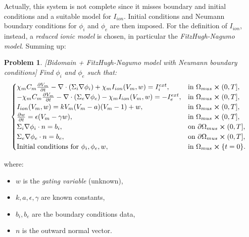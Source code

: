 \documentclass[a4paper,11pt]{article}
\newtheorem{problem}{Problem}
\begin{document}
    \vspace{4mm}
    \noindent Actually, this system is not complete since it misses boundary and initial conditions and a suitable model for $I_{ion}$. Initial conditions and Neumann boundary conditions for $\phi_i$ and $\phi_e$ are then imposed. For the definition of $I_{ion}$, instead, a \emph{reduced ionic model} is chosen, in particular the \emph{FitzHugh-Nagumo model}. Summing up:\newpage
        \begin{problem}\label{def1}[Bidomain + FitzHugh-Nagumo model with Neumann boundary conditions]
      	Find $\phi_i$ and $\phi_e$ such that:
    	\begin{equation*}
    	\begin{cases}
    	\chi_m C_m\pdv{V_m}{t} - \nabla \cdot (\Sigma_i \nabla \phi_i) + \chi_m I_{ion}(V_m,w) = I_i^{ext},    & \text{in } \Omega_{mus} \cross (0,T],
    	\\
    	-\chi_m C_m\pdv{V_m}{t} - \nabla \cdot (\Sigma_e \nabla \phi_e) - \chi_m I_{ion}(V_m,w) = -I_e^{ext},    & \text{in } \Omega_{mus} \cross (0,T],
    	\\
    	I_{ion}(V_m,w)=kV_m(V_m-a)(V_m-1)+w, & \text{in } \Omega_{mus} \cross (0,T],
    	\\
    	\pdv{w}{t} = \epsilon(V_m-\gamma w),  & \text{in } \Omega_{mus} \cross (0,T],
    	\\
    	\Sigma_i\nabla \phi_i \cdot n = b_i,   & \text{on } \partial \Omega_{mus} \cross (0,T],
    	\\
    	\Sigma_e\nabla \phi_e \cdot n = b_e,   & \text{on } \partial \Omega_{mus} \cross (0,T],
    	\\
    	\text{Initial conditions for } \phi_i,\phi_e, w, & \text{in } \Omega_{mus}\cross\{t=0\}.
    	\end{cases}
    	\end{equation*}
    	\end{problem}
    \vspace{3mm}
    where:
    \begin{itemize}[label=\textendash]
    	\item $w$ is the \emph{gating variable} (unknown),
    	\item $k,a,\epsilon,\gamma$ are known constants,
    	\item $b_i,b_e$ are the boundary conditions data,
    	\item $n$ is the outward normal vector.
    \end{itemize}
    
\end{document}
